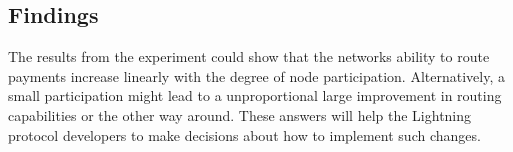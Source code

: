 \documentclass[final]{fhnwreport}       %
\begin{document}
\subsection{Findings}

The results from the experiment could show that the networks ability to route payments increase linearly with the degree of node participation. Alternatively, a small participation might lead to a unproportional large improvement in routing capabilities or the other way around. These answers will help the Lightning protocol developers to make decisions about how to implement such changes.

{%
}
\end{document}
